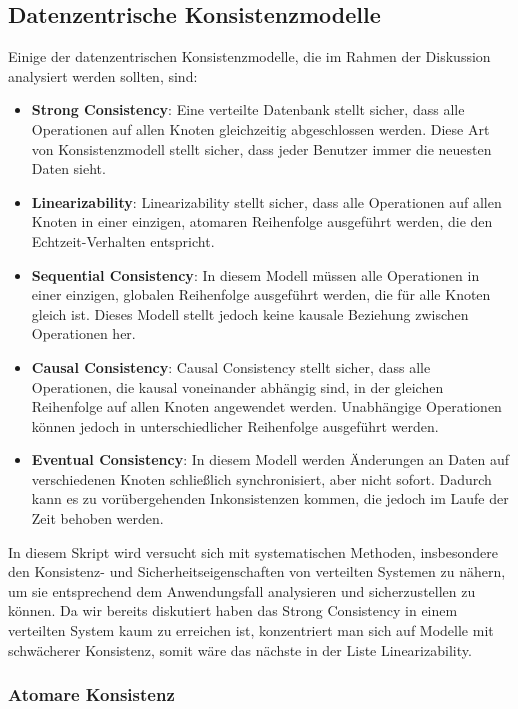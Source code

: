 \documentclass[../vs-script-first-v01.tex]{subfiles}
\begin{document}
\subsection{Datenzentrische Konsistenzmodelle}
Einige der datenzentrischen Konsistenzmodelle, die im Rahmen der Diskussion analysiert werden sollten, sind:
\begin{itemize}
\item \textbf{Strong Consistency}: Eine verteilte Datenbank stellt sicher, dass alle Operationen auf allen Knoten gleichzeitig abgeschlossen werden. Diese Art von Konsistenzmodell stellt sicher, dass jeder Benutzer immer die neuesten Daten sieht.
\item \textbf{Linearizability}: Linearizability stellt sicher, dass alle Operationen auf allen Knoten in einer einzigen, atomaren Reihenfolge ausgeführt werden, die den Echtzeit-Verhalten entspricht.
\item \textbf{Sequential Consistency}: In diesem Modell müssen alle Operationen in einer einzigen, globalen Reihenfolge ausgeführt werden, die für alle Knoten gleich ist. Dieses Modell stellt jedoch keine kausale Beziehung zwischen Operationen her.
\item \textbf{Causal Consistency}: Causal Consistency stellt sicher, dass alle Operationen, die kausal voneinander abhängig sind, in der gleichen Reihenfolge auf allen Knoten angewendet werden. Unabhängige Operationen können jedoch in unterschiedlicher Reihenfolge ausgeführt werden.
\item \textbf{Eventual Consistency}: In diesem Modell werden Änderungen an Daten auf verschiedenen Knoten schließlich synchronisiert, aber nicht sofort. Dadurch kann es zu vorübergehenden Inkonsistenzen kommen, die jedoch im Laufe der Zeit behoben werden.
\end{itemize}

In diesem Skript wird versucht sich mit systematischen Methoden, insbesondere den Konsistenz- und Sicherheitseigenschaften von verteilten Systemen zu nähern, um sie entsprechend dem Anwendungsfall analysieren und sicherzustellen zu können. Da wir bereits diskutiert haben das Strong Consistency in einem verteilten System kaum zu erreichen ist, konzentriert man sich auf Modelle mit schwächerer Konsistenz, somit wäre das nächste in der Liste Linearizability. 

\subsubsection{Atomare Konsistenz}
\end{document}
